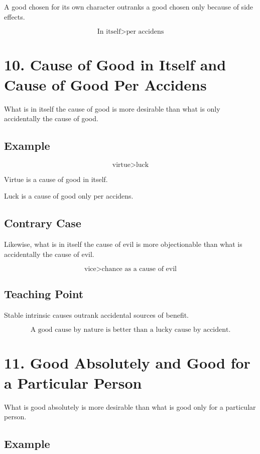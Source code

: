 \documentclass[12pt]{article}
\begin{document}
A good chosen for its own character outranks a good chosen only because of side
effects.

\[
\boxed{
\text{In itself} > \text{per accidens}
}
\]

\section*{10. Cause of Good in Itself and Cause of Good Per Accidens}

What is in itself the cause of good is more desirable than what is only
accidentally the cause of good.

\subsection*{Example}

\[
\text{virtue} > \text{luck}
\]

Virtue is a cause of good in itself.

Luck is a cause of good only per accidens.

\subsection*{Contrary Case}

Likewise, what is in itself the cause of evil is more objectionable than what is
accidentally the cause of evil.

\[
\text{vice} > \text{chance as a cause of evil}
\]

\subsection*{Teaching Point}

Stable intrinsic causes outrank accidental sources of benefit.

\[
\boxed{
\text{A good cause by nature is better than a lucky cause by accident.}
}
\]

\section*{11. Good Absolutely and Good for a Particular Person}

What is good absolutely is more desirable than what is good only for a
particular person.

\subsection*{Example}
\end{document}
